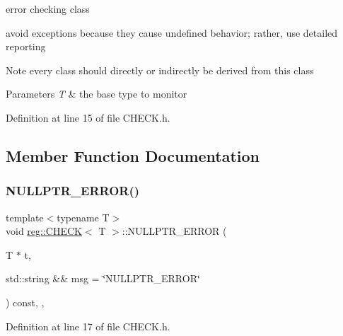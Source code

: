 error checking class 

avoid exceptions because they cause undefined behavior; rather, use detailed reporting \begin{DoxyNote}{Note}
every class should directly or indirectly be derived from this class 
\end{DoxyNote}

\begin{DoxyParams}{Parameters}
{\em T} & the base type to monitor \\
\hline
\end{DoxyParams}


Definition at line 15 of file C\+H\+E\+C\+K.\+h.



\subsection{Member Function Documentation}
\mbox{\label{structreg_1_1_c_h_e_c_k_a71d36138703b538aebcd1ca2dabd2d63}} 
\subsubsection{\texorpdfstring{N\+U\+L\+L\+P\+T\+R\+\_\+\+E\+R\+R\+O\+R()}{NULLPTR\_ERROR()}}
{\footnotesize\ttfamily template$<$typename T$>$ \\
void \hyperlink{structreg_1_1_c_h_e_c_k}{reg\+::\+C\+H\+E\+CK}$<$ T $>$\+::N\+U\+L\+L\+P\+T\+R\+\_\+\+E\+R\+R\+OR (\begin{DoxyParamCaption}\item[{T $\ast$}]{t,  }\item[{std\+::string \&\&}]{msg = {\ttfamily \char`\"{}NULLPTR\+\_\+ERROR\char`\"{}} }\end{DoxyParamCaption}) const\hspace{0.3cm}{\ttfamily [inline]}, {\ttfamily [protected]}, {\ttfamily [noexcept]}}



Definition at line 17 of file C\+H\+E\+C\+K.\+h.

\mbox{\label{structreg_1_1_c_h_e_c_k_ab3559ddae75930312bb95e57dc07f655}} 
